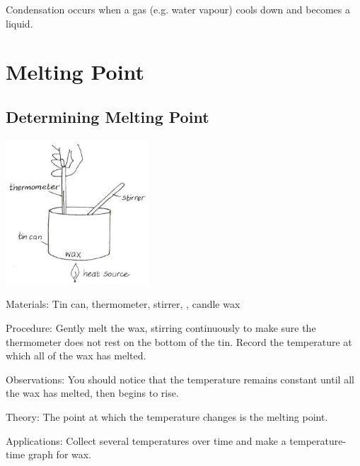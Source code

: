 \begin{multicols}{2}
Condensation occurs when a gas (e.g. water vapour) cools down and becomes a liquid.


\section*{Melting Point}


\subsection{Determining Melting Point}

\begin{center}
\includegraphics[width=0.4\textwidth]{./img/vso/melting-point.png}
\end{center}

\begin{description*}
\item[Materials:]{Tin can, thermometer, stirrer, , candle wax}
\item[Procedure:]{Gently melt the wax, stirring continuously to make sure the thermometer does not rest on the bottom of the tin. Record the temperature at which all of the wax has melted.}
\item[Observations:]{You should notice that the temperature remains constant until all the wax has melted, then begins to rise.}
\item[Theory:]{The point at which the temperature changes is the melting point.}
\item[Applications:]{Collect several temperatures over time and make a temperature-time graph for wax.}
\end{description*}


\end{multicols}
